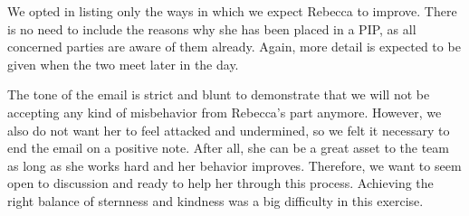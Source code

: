 \documentclass[]{article}
\begin{document}
We opted in listing only the ways in which we expect Rebecca to improve. There is no need to include the reasons why she has been placed in a PIP, as all concerned parties are aware of them already. Again, more detail is expected to be given when the two meet later in the day.

The tone of the email is strict and blunt to demonstrate that we will not be accepting any kind of misbehavior from Rebecca's part anymore. However, we also do not want her to feel attacked and undermined, so we felt it necessary to end the email on a positive note. After all, she can be a great asset to the team as long as she works hard and her behavior improves. Therefore, we want to seem open to discussion and ready to help her through this process. Achieving the right balance of sternness and kindness was a big difficulty in this exercise.
\end{document}
